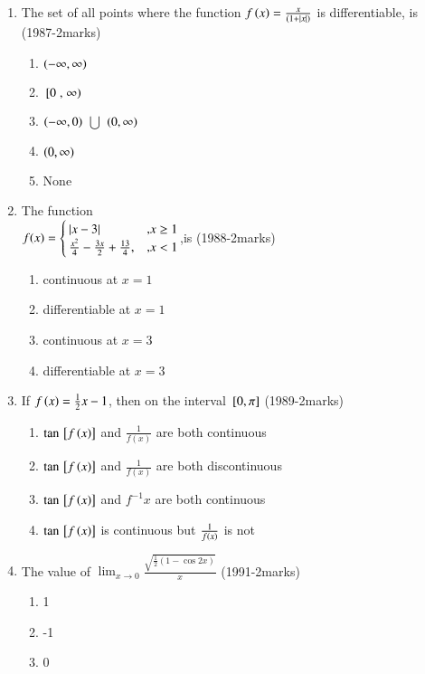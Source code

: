 \documentclass[journal]{IEEEtran}
\numberwithin{equation}{enumi}
\numberwithin{figure}{enumi}
\begin{document}
\begin{enumerate}
\begin{enumerate}
		\end{enumerate}
	\item The set of all points where the function $f\left(x\right)=\frac{x}{(1+\left\vert x\right\vert)}$ is differentiable, is \\ \hfill{(1987-2marks)}
		\begin{enumerate}
			\item $\left(- \infty, \infty\right)$
			\item ${}\left[0\right., \left.\infty\right)$
			\item $\left(- \infty,0\right)$ $\bigcup$ $\left(0, \infty\right)$
			\item $\left(0, \infty\right)$
			\item None 
		\end{enumerate}
	\item The function \\ $f(x)=\begin{cases}\left\vert x-3\right\vert & \text{,} x \geq 1 \\ \frac{x^2}{4}-\frac{3x}{2}+\frac{13}{4}, & \text{,} x<1 \end{cases}$,is \hfill{(1988-2marks)}
			\begin{enumerate}
				\item continuous at $x=1$
				\item differentiable at $x=1$
				\item continuous at $x=3$
				\item differentiable at $x=3$
			\end{enumerate}
		\item If $f\left(x\right) = \frac{1}{2}x-1$, then on the interval ${}\left[0,\pi\right]$ \hfill{(1989-2marks)}
			\begin{enumerate}
				\item $\tan{\ensuremath{{}\left[f\left(x\right)\right]}}$ and $\frac{1}{f(x)}$ are both continuous
				\item $\tan{\ensuremath{{}\left[f\left(x\right)\right]}}$ and $\frac{1}{f(x)}$ are both discontinuous
				\item $\tan{\ensuremath{{}\left[f\left(x\right)\right]}}$ and $f^{-1}x$ are both continuous
				\item $\tan{\ensuremath{{}\left[f\left(x\right)\right]}}$ is continuous but $\frac{1}{f\left(x\right)}$ is not
			\end{enumerate}
		\item The value of $\lim_{x\to0}{\frac{\sqrt{\frac{1}{2}(1-\cos{2x})}}{x}}$ \hfill{(1991-2marks)}
			\begin{enumerate}
				\item 1
				\item -1
				\item 0

\end{enumerate}
\end{enumerate}
\end{document}
